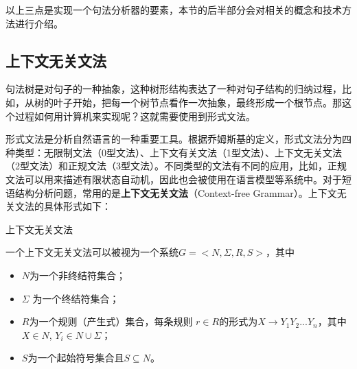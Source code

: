 \parinterval 以上三点是实现一个句法分析器的要素，本节的后半部分会对相关的概念和技术方法进行介绍。


\subsection{上下文无关文法}

\parinterval 句法树是对句子的一种抽象，这种树形结构表达了一种对句子结构的归纳过程，比如，从树的叶子开始，把每一个树节点看作一次抽象，最终形成一个根节点。那这个过程如何用计算机来实现呢？这就需要使用到形式文法。

\parinterval 形式文法是分析自然语言的一种重要工具。根据乔姆斯基的定义，形式文法分为四种类型：无限制文法（0型文法）、上下文有关文法（1型文法）、上下文无关文法（2型文法）和正规文法（3型文法）。不同类型的文法有不同的应用，比如，正规文法可以用来描述有限状态自动机，因此也会被使用在语言模型等系统中。对于短语结构分析问题，常用的是{\small\sffamily\bfseries{上下文无关文法}}（Context-free Grammar）。上下文无关文法的具体形式如下：

\vspace{0.5em}
\begin{definition} 上下文无关文法

一个上下文无关文法可以被视为一个系统$G=<N,\varSigma,R,S>$，其中

\begin{itemize}
\vspace{0.5em}
\item $N$为一个非终结符集合；
\vspace{0.5em}
\item $\varSigma$ 为一个终结符集合；
\vspace{0.5em}
\item $R$为一个规则（产生式）集合，每条规则 $r \in R$的形式为$X \to Y_1Y_2...Y_n$，其中$X \in N$, $Y_i \in N \cup \varSigma$；
\vspace{0.5em}
\item $S$为一个起始符号集合且$S \subseteq N$。
\vspace{0.5em}
\end{itemize}
\end{definition}

